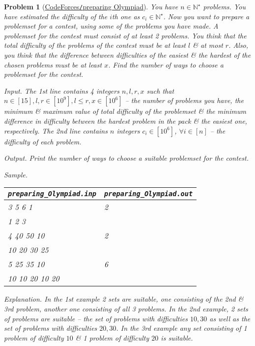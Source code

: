 \documentclass{article}
\newtheorem{problem}{Problem}
\begin{document}
\begin{problem}[\href{https://codeforces.com/contest/550/problem/B}{CodeForces{\tt/}preparing Olympiad}]
    You have $n\in\mathbb{N}^\star$ problems. You have estimated the difficulty of the $i$th one as $c_i\in\mathbb{N}^\star$. Now you want to prepare a problemset for a contest, using some of the problems you have made. A problemset for the contest must consist of at least 2 problems. You think that the total difficulty of the problems of the contest must be at least $l$ \& at most $r$. Also, you think that the difference between difficulties of the easiest \& the hardest of the chosen problems must be at least $x$. Find the number of ways to choose a problemset for the contest.
    \item {\sf Input.} The 1st line contains 4 integers $n,l,r,x$ such that $n\in[15],l,r\in[10^9],l\le r,x\in[10^6]$ -- the number of problems you have, the minimum \& maximum value of total difficulty of the problemset \& the minimum difference in difficulty between the hardest problem in the pack \& the easiest one, respectively. The 2nd line contains $n$ integers $c_i\in[10^6]$, $\forall i\in[n]$ -- the difficulty of each problem.
    \item {\sf Output.} Print the number of ways to choose a suitable problemset for the contest.
    \item {\sf Sample.}
    \begin{table}[H]
        \centering
        \begin{tabular}{|l|l|}
            \hline
            \verb|preparing_Olympiad.inp| & \verb|preparing_Olympiad.out| \\
            \hline
            3 5 6 1 & 2 \\
            1 2 3 & \\
            \hline
            4 40 50 10 & 2 \\
            10 20 30 25 & \\
            \hline
            5 25 35 10 & 6 \\
            10 10 20 10 20 & \\
            \hline
        \end{tabular}
    \end{table}
    \item {\sf Explanation.} In the 1st example 2 sets are suitable, one consisting of the 2nd \& 3rd problem, another one consisting of all 3 problems. In the 2nd example, 2 sets of problems are suitable -- the set of problems with difficulties $10,30$ as well as the set of problems with difficulties $20,30$. In the 3rd example any set consisting of 1 problem of difficulty $10$ \& 1 problem of difficulty $20$ is suitable.
\end{problem}
\end{document}
